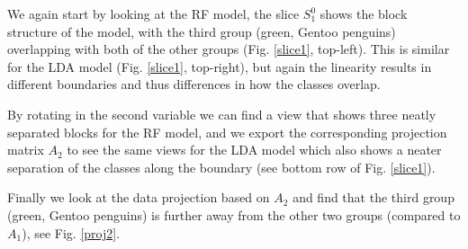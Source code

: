 \documentclass[]{interact}
\theoremstyle{plain}%
\theoremstyle{definition}
\theoremstyle{remark}
\begin{document}
We again start by looking at the RF model, the slice \(S_1^0\) shows the
block structure of the model, with the third group (green, Gentoo
penguins) overlapping with both of the other groups (Fig. \ref{slice1},
top-left). This is similar for the LDA model (Fig. \ref{slice1},
top-right), but again the linearity results in different boundaries and
thus differences in how the classes overlap.

By rotating in the second variable we can find a view that shows three
neatly separated blocks for the RF model, and we export the
corresponding projection matrix \(A_2\) to see the same views for the
LDA model which also shows a neater separation of the classes along the
boundary (see bottom row of Fig. \ref{slice1}).

Finally we look at the data projection based on \(A_2\) and find that
the third group (green, Gentoo penguins) is further away from the other
two groups (compared to \(A_1\)), see Fig. \ref{proj2}.
\end{document}

